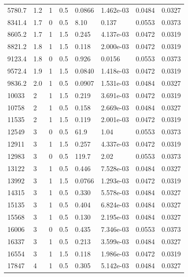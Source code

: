 \documentclass[preview]{standalone}
\begin{document}
{{\begin{tabular}{L{1.2cm}C{1.2cm} C{0.3cm}C{0.5cm} C{1.4cm}C{1.4cm} C{1.4cm}C{1.4cm}}
  5780.7  &   1.2  & 1     & 0.5 &  0.0866  & 1.462e-03  & 0.0484 &  0.0327   \\ 
  8341.4  &   1.7  & 0     & 0.5 &  8.10  & 0.137  & 0.0553 &  0.0373   \\ 
  8605.2  &   1.7  & 1     & 1.5 &  0.245  & 4.137e-03  & 0.0472 &  0.0319   \\ 
  8821.2  &   1.8  & 1     & 1.5 &  0.118  & 2.000e-03  & 0.0472 &  0.0319   \\ 
  9123.4  &   1.8  & 0     & 0.5 &  0.926  & 0.0156  & 0.0553 &  0.0373   \\ 
  9572.4  &   1.9  & 1     & 1.5 &  0.0840  & 1.418e-03  & 0.0472 &  0.0319   \\ 
  9836.2  &   2.0  & 1     & 0.5 &  0.0907  & 1.531e-03  & 0.0484 &  0.0327   \\ 
  10033  &     2  & 1     & 1.5 &  0.219  & 3.691e-03  & 0.0472 &  0.0319   \\ 
  10758  &     2  & 1     & 0.5 &  0.158  & 2.669e-03  & 0.0484 &  0.0327   \\ 
  11535  &     2  & 1     & 1.5 &  0.119  & 2.001e-03  & 0.0472 &  0.0319   \\ 
  12549  &     3  & 0     & 0.5 &  61.9  & 1.04  & 0.0553 &  0.0373   \\ 
  12911  &     3  & 1     & 1.5 &  0.257  & 4.337e-03  & 0.0472 &  0.0319   \\ 
  12983  &     3  & 0     & 0.5 &  119.7  & 2.02  & 0.0553 &  0.0373   \\ 
  13122  &     3  & 1     & 0.5 &  0.446  & 7.528e-03  & 0.0484 &  0.0327   \\ 
  13992  &     3  & 1     & 1.5 &  0.0766  & 1.293e-03  & 0.0472 &  0.0319   \\ 
  14315  &     3  & 1     & 0.5 &  0.330  & 5.578e-03  & 0.0484 &  0.0327   \\ 
  15135  &     3  & 1     & 0.5 &  0.404  & 6.824e-03  & 0.0484 &  0.0327   \\ 
  15568  &     3  & 1     & 0.5 &  0.130  & 2.195e-03  & 0.0484 &  0.0327   \\ 
  16006  &     3  & 0     & 0.5 &  0.435  & 7.346e-03  & 0.0553 &  0.0373   \\ 
  16337  &     3  & 1     & 0.5 &  0.213  & 3.599e-03  & 0.0484 &  0.0327   \\ 
  16554  &     3  & 1     & 1.5 &  0.118  & 1.986e-03  & 0.0472 &  0.0319   \\ 
  17847  &     4  & 1     & 0.5 &  0.305  & 5.142e-03  & 0.0484 &  0.0327   \\ 

\end{tabular}}}
\end{document}
